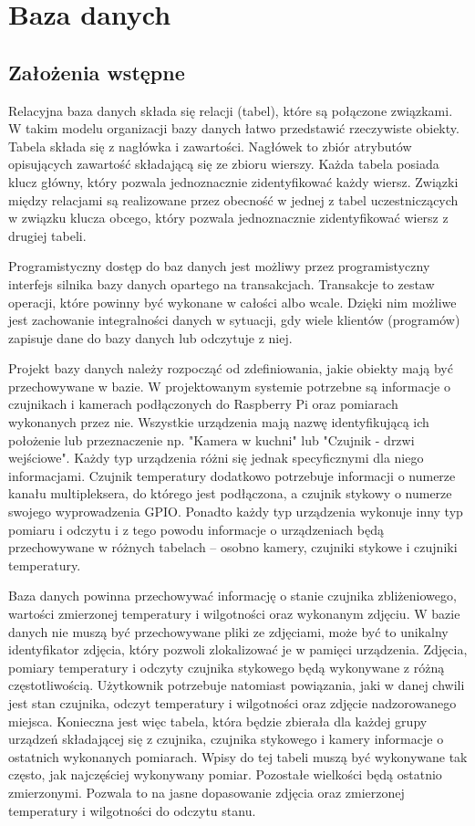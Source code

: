 \documentclass[a4paper,12pt,twoside]{article}
\begin{document}
\section{Baza danych}
\subsection{Założenia wstępne}
Relacyjna baza danych składa się relacji (tabel), które są połączone związkami. W takim modelu organizacji bazy danych łatwo przedstawić rzeczywiste obiekty. Tabela składa się z nagłówka i zawartości. Nagłówek to zbiór atrybutów opisujących zawartość składającą się ze zbioru wierszy. Każda tabela posiada klucz główny, który pozwala jednoznacznie zidentyfikować każdy wiersz. Związki między relacjami są realizowane przez obecność w jednej z tabel uczestniczących w związku klucza obcego, który pozwala jednoznacznie zidentyfikować wiersz z drugiej tabeli.

Programistyczny dostęp do baz danych jest możliwy przez programistyczny interfejs silnika bazy danych opartego na transakcjach. Transakcje to zestaw operacji, które powinny być wykonane w całości albo wcale. Dzięki nim możliwe jest zachowanie integralności danych w sytuacji, gdy wiele klientów (programów) zapisuje dane do bazy danych lub odczytuje z niej.

Projekt bazy danych należy rozpocząć od zdefiniowania, jakie obiekty mają być przechowywane w bazie. W projektowanym systemie potrzebne są informacje o czujnikach i kamerach podłączonych do Raspberry Pi oraz pomiarach wykonanych przez nie. Wszystkie urządzenia mają nazwę identyfikującą ich położenie lub przeznaczenie np. "Kamera w kuchni" lub "Czujnik - drzwi wejściowe". Każdy typ urządzenia różni się jednak specyficznymi dla niego informacjami. Czujnik temperatury dodatkowo potrzebuje informacji o numerze kanału multipleksera, do którego jest podłączona, a czujnik stykowy o numerze swojego wyprowadzenia GPIO. Ponadto każdy typ urządzenia wykonuje inny typ pomiaru i odczytu i z tego powodu informacje o urządzeniach będą przechowywane w różnych tabelach -- osobno kamery, czujniki stykowe i czujniki temperatury.

Baza danych powinna przechowywać informację o stanie czujnika zbliżeniowego, wartości zmierzonej temperatury i wilgotności oraz wykonanym zdjęciu. W bazie danych nie muszą być przechowywane pliki ze zdjęciami, może być to unikalny identyfikator zdjęcia, który pozwoli zlokalizować je w pamięci urządzenia. Zdjęcia, pomiary temperatury i odczyty czujnika stykowego będą wykonywane z różną częstotliwością. Użytkownik potrzebuje natomiast powiązania, jaki w danej chwili jest stan czujnika, odczyt temperatury i wilgotności oraz zdjęcie nadzorowanego miejsca. Konieczna jest więc tabela, która będzie zbierała dla każdej grupy urządzeń składającej się z czujnika, czujnika stykowego i kamery informacje o ostatnich wykonanych pomiarach. Wpisy do tej tabeli muszą być wykonywane tak często, jak najczęściej wykonywany pomiar. Pozostałe wielkości będą ostatnio zmierzonymi. Pozwala to na jasne dopasowanie zdjęcia oraz zmierzonej temperatury i wilgotności do odczytu stanu.
\end{document}
